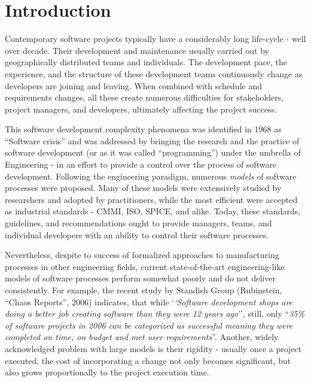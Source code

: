 \chapter{Introduction}
Contemporary software projects typically have a considerably long life-cycle - well over decade.
Their development and maintenance usually carried out by geographically distributed teams 
and individuals. The development pace, the experience, and the structure of these development 
teams continuously change as developers are joining and leaving. When combined with
schedule and requirements changes, all these create numerous difficulties for stakeholders,
project managers, and developers, ultimately affecting the project success. 

This software development complexity phenomena was identified in 1968 as ``Software crisis'' 
and was addressed by bringing the research and the practice of software development 
(or as it was called ``programming'') under the umbrella of Engineering - in an effort to provide a 
control over the process of software development. 
Following the engineering paradigm, numerous \textit{models} of software processes were proposed.
Many of these models were extensively studied by researchers and adopted by practitioners, 
while the most efficient were accepted as industrial standards - CMMI, ISO, SPICE, and alike.
Today, these standards, guidelines, and recommendations ought to provide managers, teams, 
and individual developers with an ability to control their software processes.

Nevertheless, despite to success of formalized approaches to manufacturing processes in other 
engineering fields, current state-of-the-art engineering-like models of software processes perform 
somewhat poorly and do not deliver consistently. 
For example, the recent study by Standish Group (Rubinstein, ``Chaos Reports'', 2006) indicates,
that while `\textit{`Software development shops are doing a better job creating software than they were 
12 years ago}'', still, only ``\textit{35\% of software projects in 2006 can be categorized 
as successful meaning they were completed on time, on budget and met user requirements}”.
Another, widely acknowledged problem with large models is their rigidity - usually once a project executed, 
the cost of incorporating a change not only becomes significant, but also grows proportionally to 
the project execution time.

